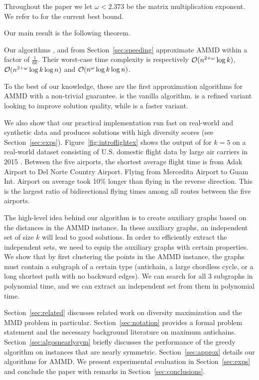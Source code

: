 Throughout the paper we let $\omega < 2.373$ be the matrix multiplication exponent. We refer to \cite{alman2021refined} for the current best bound.

Our main result is the following theorem.
\begin{theorem}
Our algorithms \algbac{}, \algbacb{} and \algbacf{} from Section~\ref{sec:speeding} approximate AMMD within a factor of $\frac{1}{6k}$. Their worst-case time complexity is respectively $\mathcal{O}(n^{2+\omega} \log k)$, $\mathcal{O}(n^{2+\omega} \log k \log
n)$ and $\mathcal{O}(n^{\omega} \log k \log n )$.
\end{theorem} 

To the best of our knowledge, these are the first approximation algorithms for AMMD with a non-trivial guarantee. \algbac{} is the vanilla algorithm. \algbacb{} is a refined variant looking to improve solution quality, while \algbacf{} is a faster variant.

We also show that our practical implementation run fast on real-world and synthetic data and produces solutions with high diversity scores (see Section~\ref{sec:exps}). Figure~\ref{fig:introflightex} shows the output of \algbacf{} for $k=5$ on a real-world dataset consisting of U.S. domestic flight data by large air carriers in 2015 \cite{FlightsDelay}. Between the five airports, the shortest average flight time is from Adak Airport to Del Norte Country Airport. Flying from Mercedita Airport to Guam Int. Airport on average took 10\% longer than flying in the reverse direction. This is the largest ratio of bidirectional flying times among all routes between the five airports.

The high-level idea behind our algorithm is to create auxiliary graphs based on the distances in the AMMD instance. In these auxiliary graphs, an independent set of size $k$ will lead to good solutions. In order to efficiently extract the independent sets, we need to equip the auxiliary graphs with certain properties. We show that by first clustering the points in the AMMD instance, the graphs must contain a subgraph of a certain type (antichain, a large chordless cycle, or a long shortest path with no backward edges). We can search for all 3 subgraphs in polynomial time, and we can extract an independent set from them in polynomial time.

 Section~\ref{sec:related} discusses related work on diversity maximization and the MMD problem in particular. Section~\ref{sec:notation} provides a formal problem statement and the necessary background literature on maximum antichains.
Section~\ref{sec:algosnearlysym} briefly discusses the performance of the greedy algorithm on instances that are nearly symmetric. Section~\ref{sec:approx} details our algorithms for AMMD. We present experimental evaluation in Section~\ref{sec:exps} and conclude the paper with remarks in Section~\ref{sec:conclusions}.
